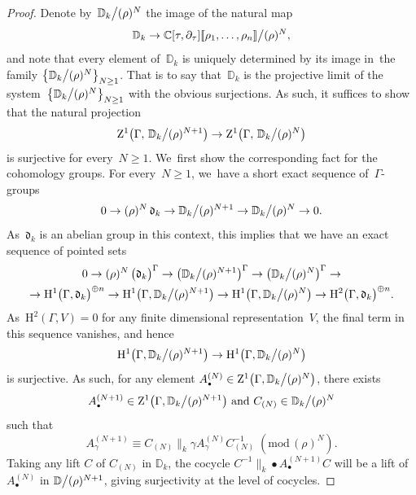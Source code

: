 \documentclass[JEP,XML,SOM,Unicode,published]{cedram}
\let\oldbullet\bullet
\renewcommand{\bullet}{{\scriptscriptstyle\oldbullet}}
\theoremstyle{plain}
\theoremstyle{definition}
\newcommand{\tx}{\text}
\newcommand{\nbd}{\nobreakdash-\hspace{0pt}}
\newcommand{\bbC}{\ensuremath{\mathbb{C}}}
\newcommand{\bbD}{\ensuremath{\mathbb{D}}}
\newcommand{\frakd}{\ensuremath{\mathfrak{d}}}
\newcommand{\rmH}{\ensuremath{\mathrm{H}}}
\newcommand{\rmZ}{\ensuremath{\mathrm{Z}}}
\newcommand{\llbrkt}{[\![}
\newcommand{\rrbrkt}{]\!]}
\renewcommand{\pmod}[1]{\;(\mathrm{mod}\, #1)}
\let\Ga\Gamma
\let\ga\gamma
\begin{document}
\begin{proof}
Denote by~$\bbD_k\big\slash (\rho)^N$ the image of the natural map
\begin{equation*}
	\bbD_k
\to
	\bbC[\tau,\partial_\tau]\llbrkt \rho_1,\ldots,\rho_n\rrbrkt \big\slash (\rho)^N
\tx{,}
\end{equation*}
and note that every element of~$\bbD_k$ is uniquely determined by its image in~the family $\big\{\bbD_k\big\slash (\rho)^N\big\}_{N\geq 1}$. That is to say that~$\bbD_k$ is the projective limit of the system~$\big\{\bbD_k\big\slash (\rho)^N\big\}_{N\geq 1}$ with the obvious surjections. As such, it suffices to show that the natural projection
\begin{equation*}
\rmZ^1\bigl(\Ga,\, \bbD_k \big\slash (\rho)^{N+1} \bigr)
\to
\rmZ^1\bigl(\Ga,\, \bbD_k \big\slash (\rho)^{N} \bigr)
\end{equation*}
is surjective for every~$N\geq 1$. We~first show the corresponding fact for the cohomology groups. For every~$N \geq 1$, we~have a short exact sequence of~$\Ga$\nbd{}groups
\begin{equation*}
0
\to
(\rho)^N\, \frakd_k
\to
\bbD_k \big\slash (\rho)^{N+1}
\to
\bbD_k\big\slash (\rho)^{N}
\to
0
\tx{.}
\end{equation*}
As~$\frakd_k$ is an abelian group in this context, this implies that we have an exact sequence of pointed sets
\begin{multline*}
0
\to
(\rho)^N\, \bigl(\frakd_k\bigr)^\Ga
\to
\bigl(\bbD_k \big\slash (\rho)^{N+1} \bigr)^\Ga
\to
\bigl(\bbD_k \big\slash (\rho)^{N} \bigr)^\Ga
\to
\\
\to
\rmH^1\bigl(\Ga, \frakd_k\bigr)^{\oplus n}
\to
\rmH^1\bigl(\Ga, \bbD_k\big\slash (\rho)^{N+1} \bigr)
\to
\rmH^1\bigl(\Ga, \bbD_k\big\slash (\rho)^{N} \bigr)
\to
\rmH^2\bigl(\Ga, \frakd_k\bigr)^{\oplus n}
\tx{.}
\end{multline*}
As~$\rmH^2(\Ga,V) = 0$ for any finite dimensional representation~$V$, the final term in this sequence vanishes, and hence
\begin{equation*}
	\rmH^1\bigl(\Ga, \bbD_k\big\slash (\rho)^{N+1}\bigr)
\to
	\rmH^1\bigl(\Ga, \bbD_k\big\slash (\rho)^{N}\bigr)
\end{equation*}
is surjective. As such, for any element $A_\bullet^{(N)}\in \rmZ^1\bigl(\Ga,\bbD_k\big\slash (\rho)^{N}\bigr)$, there exists
\[
A_\bullet^{(N+1)}\in \rmZ^1\bigl(\Ga,\bbD_k\big\slash (\rho)^{N+1}\bigr)\tx{ and }C_{(N)}\in\bbD_k\big\slash (\rho)^N\]
such that
\[
A_\ga^{(N+1)} \equiv C_{(N)}\big\|_k\ga A_\ga^{(N)} C_{(N)}^{-1} \pmod{(\rho)^{N}}.\]
Taking any lift $C$ of $C_{(N)}$ in $\bbD_k$, the cocycle $C^{-1}\big\|_k\bullet A_\bullet^{(N+1)} C$ will be a lift of $A_\bullet^{(N)}$ in $\bbD\big\slash (\rho)^{N+1}$, giving surjectivity at the level of cocycles.
\end{proof}
\end{document}

